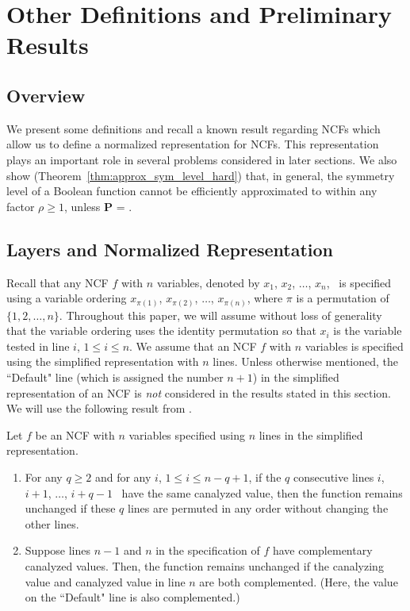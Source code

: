 \section{Other Definitions and Preliminary Results}
\label{sec:prelim}

\subsection{Overview}

We present some definitions and recall
a known result regarding NCFs which allow us
to define a normalized representation for NCFs.
This representation plays an important role in several
problems considered in later sections.
We also show (Theorem~\ref{thm:approx_sym_level_hard}) 
that, in general, the symmetry level
of a Boolean function cannot be efficiently approximated to within any
factor $\rho \geq 1$, unless \textbf{P} = \cnp.

\medskip

\subsection{Layers and Normalized Representation}
\label{sse:ncf_layer}

Recall that any NCF $f$ with $n$ variables,
denoted by $x_1$, $x_2$, $\ldots$, $x_n$,~
is specified using a variable ordering 
$x_{\pi(1)}$, $x_{\pi(2)}$, $\ldots$,  $x_{\pi(n)}$,
where $\pi$ is a permutation of $\{1, 2, \ldots, n\}$.
Throughout this paper, we will assume without loss of generality
that the variable ordering uses the identity permutation 
so that $x_i$ is the variable tested in line $i$, $1 \leq i \leq n$. 
We assume that an NCF $f$ with $n$
variables is specified using the simplified representation with $n$ lines. 
Unless otherwise mentioned, the ``Default" line (which is assigned the number $n+1$)
in the simplified representation of an NCF is \emph{not} considered
in the results stated in this section.
We will use the following result from \cite{Stearns-etal-2018}.

\begin{observation} \label{obs:ncf_transformations}
Let $f$ be an NCF with $n$ variables specified using $n$ lines
in the simplified representation. 
\begin{enumerate}
\item 
For any $q \geq 2$ and for any $i$, $1 \leq i \leq n-q+1$,
if the $q$ consecutive lines $i$, $i+1$, $\ldots$, $i+q-1$~
have the same canalyzed value, then the function remains
unchanged if these $q$ lines are permuted in any order
without changing the other lines.

\item 
Suppose lines $n-1$ and $n$ in the specification of $f$ 
have complementary canalyzed values.
Then, the function remains unchanged 
if the canalyzing value and canalyzed value in line $n$
are both complemented. 
(Here, the value on the ``Default" line is also complemented.)
\QED
\end{enumerate}
\end{observation}

